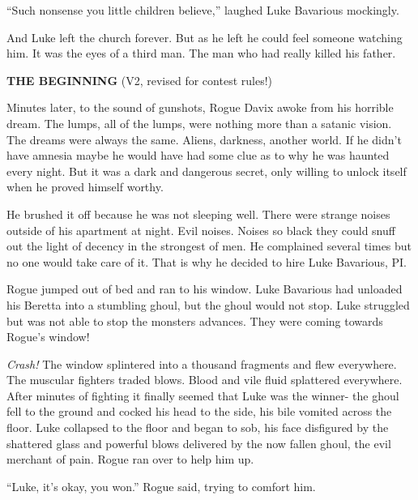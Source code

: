 ``Such nonsense you little children believe,'' laughed
Luke Bavarious mockingly.



And Luke left the church forever. But as he left he could feel
someone watching him. It was the eyes of a third man. The man who
had really killed his father. 
 





{\bf THE BEGINNING} (V2, revised for contest rules!)



Minutes later, to the sound of gunshots, Rogue Davix awoke from his
horrible dream. The lumps, all of the lumps, were nothing more than
a satanic vision. The dreams were always the same. Aliens,
darkness, another world. If he didn't have amnesia maybe he
would have had some clue as to why he was haunted every night. But
it was a dark and dangerous secret, only willing to unlock itself
when he proved himself worthy.



He brushed it off because he was not sleeping well. There were
strange noises outside of his apartment at night. Evil noises.
Noises so black they could snuff out the light of decency in the
strongest of men. He complained several times but no one would take
care of it. That is why he decided to hire Luke Bavarious,
PI.



Rogue jumped out of bed and ran to his window. Luke Bavarious had
unloaded his Beretta into a stumbling ghoul, but the ghoul would
not stop. Luke struggled but was not able to stop the monsters
advances. They were coming towards Rogue's window!



{\em Crash!} The window splintered into a thousand fragments and
flew everywhere. The muscular fighters traded blows. Blood and vile
fluid splattered everywhere. After minutes of fighting it finally
seemed that Luke was the winner- the ghoul fell to the ground and
cocked his head to the side, his bile vomited across the floor.
Luke collapsed to the floor and began to sob, his face disfigured
by the shattered glass and powerful blows delivered by the now
fallen ghoul, the evil merchant of pain. Rogue ran over to help him
up.



``Luke, it's okay, you won.'' Rogue said, trying to
comfort him.

